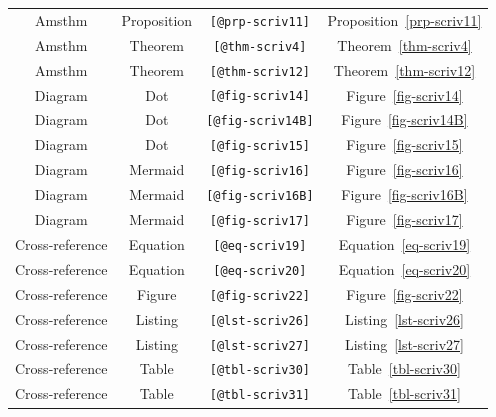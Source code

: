 \documentclass[
  12pt,
  a4paper,
  oneside,
  numbers=noenddot,
  titlepage,
  toclink=all,
  toc=bibliography]{scrbook}
\theoremstyle{definition}
\theoremstyle{definition}
\theoremstyle{definition}
\theoremstyle{plain}
\theoremstyle{plain}
\theoremstyle{plain}
\theoremstyle{plain}
\theoremstyle{plain}
\theoremstyle{remark}
\begin{document}
\begin{longtable}[]{@{}cccc@{}}
Amsthm & Proposition & \texttt{{[}@prp-scriv11{]}} &
\protect\hypertarget{cite_20}{}{\label{cite_20}Proposition~\ref{prp-scriv11}} \\
Amsthm & Theorem & \texttt{{[}@thm-scriv4{]}} &
\protect\hypertarget{cite_21}{}{\label{cite_21}Theorem~\ref{thm-scriv4}} \\
Amsthm & Theorem & \texttt{{[}@thm-scriv12{]}} &
\protect\hypertarget{cite_22}{}{\label{cite_22}Theorem~\ref{thm-scriv12}} \\
Diagram & Dot & \texttt{{[}@fig-scriv14{]}} &
\protect\hypertarget{cite_23}{}{\label{cite_23}Figure~\ref{fig-scriv14}} \\
Diagram & Dot & \texttt{{[}@fig-scriv14B{]}} &
\protect\hypertarget{cite_24}{}{\label{cite_24}Figure~\ref{fig-scriv14B}} \\
Diagram & Dot & \texttt{{[}@fig-scriv15{]}} &
\protect\hypertarget{cite_25}{}{\label{cite_25}Figure~\ref{fig-scriv15}} \\
Diagram & Mermaid & \texttt{{[}@fig-scriv16{]}} &
\protect\hypertarget{cite_26}{}{\label{cite_26}Figure~\ref{fig-scriv16}} \\
Diagram & Mermaid & \texttt{{[}@fig-scriv16B{]}} &
\protect\hypertarget{cite_27}{}{\label{cite_27}Figure~\ref{fig-scriv16B}} \\
Diagram & Mermaid & \texttt{{[}@fig-scriv17{]}} &
\protect\hypertarget{cite_28}{}{\label{cite_28}Figure~\ref{fig-scriv17}} \\
Cross-reference & Equation & \texttt{{[}@eq-scriv19{]}} &
\protect\hypertarget{cite_29}{}{\label{cite_29}Equation~\ref{eq-scriv19}} \\
Cross-reference & Equation & \texttt{{[}@eq-scriv20{]}} &
\protect\hypertarget{cite_30}{}{\label{cite_30}Equation~\ref{eq-scriv20}} \\
Cross-reference & Figure & \texttt{{[}@fig-scriv22{]}} &
\protect\hypertarget{cite_31}{}{\label{cite_31}Figure~\ref{fig-scriv22}} \\
Cross-reference & Listing & \texttt{{[}@lst-scriv26{]}} &
\protect\hypertarget{cite_32}{}{\label{cite_32}Listing~\ref{lst-scriv26}} \\
Cross-reference & Listing & \texttt{{[}@lst-scriv27{]}} &
\protect\hypertarget{cite_33}{}{\label{cite_33}Listing~\ref{lst-scriv27}} \\
Cross-reference & Table & \texttt{{[}@tbl-scriv30{]}} &
\protect\hypertarget{cite_34}{}{\label{cite_34}Table~\ref{tbl-scriv30}} \\
Cross-reference & Table & \texttt{{[}@tbl-scriv31{]}} &
\protect\hypertarget{cite_35}{}{\label{cite_35}Table~\ref{tbl-scriv31}} \\

\end{longtable}
\end{document}
